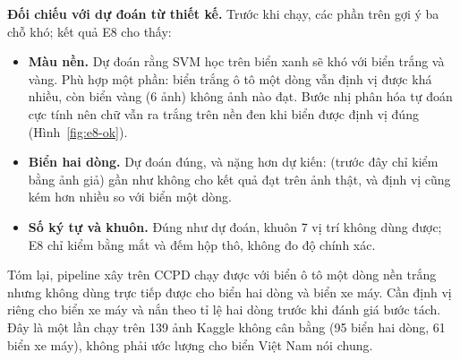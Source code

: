 \textbf{Đối chiếu với dự đoán từ thiết kế.} Trước khi chạy, các phần trên gợi ý ba chỗ khó; kết quả E8 cho thấy:
\begin{itemize}
  \item \textbf{Màu nền.} Dự đoán rằng SVM học trên biển xanh sẽ khó với biển trắng và vàng. Phù hợp một phần: biển trắng ô tô một dòng vẫn định vị được khá nhiều, còn biển vàng (6 ảnh) không ảnh nào đạt. Bước nhị phân hóa tự đoán cực tính nên chữ vẫn ra trắng trên nền đen khi biển được định vị đúng (Hình~\ref{fig:e8-ok}).
  \item \textbf{Biển hai dòng.} Dự đoán đúng, và nặng hơn dự kiến:  (trước đây chỉ kiểm bằng ảnh giả) gần như không cho kết quả đạt trên ảnh thật, và định vị cũng kém hơn nhiều so với biển một dòng.
  \item \textbf{Số ký tự và khuôn.} Đúng như dự đoán, khuôn 7 vị trí không dùng được; E8 chỉ kiểm bằng mắt và đếm hộp thô, không đo độ chính xác.
\end{itemize}
Tóm lại, pipeline xây trên CCPD chạy được với biển ô tô một dòng nền trắng nhưng không dùng trực tiếp được cho biển hai dòng và biển xe máy. Cần định vị riêng cho biển xe máy và nắn theo tỉ lệ hai dòng trước khi đánh giá bước tách. Đây là một lần chạy trên 139 ảnh Kaggle không cân bằng (95 biển hai dòng, 61 biển xe máy), không phải ước lượng cho biển Việt Nam nói chung.
